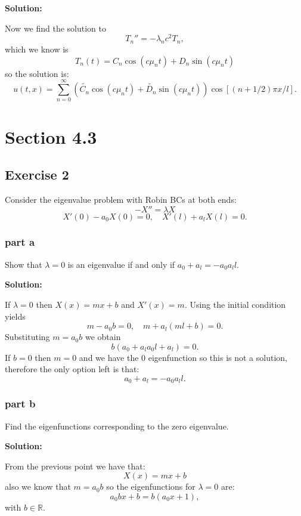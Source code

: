 \documentclass{article}
\begin{document}
\textbf{Solution:}

Now we find the solution to
\[
    T_n''=-\lambda_nc^2T_n,
\]
which we know is
\[
T_n(t)=C_n\cos(c\mu_n t) + D_n\sin(c\mu_n t)
\]
so the solution is:
\[
u(t,x)=\sum_{n=0}^\infty \left(\widetilde{C_n}\cos(c\mu_n t) +
    \widetilde{D_n}\sin(c\mu_n t)\right)\cos\left[\left(n+1/2\right)\pi
x/l\right].
\]
\section{Section 4.3}
\subsection{Exercise 2}
Consider the eigenvalue problem with Robin BCs at both ends:
\[
    -X''=\lambda X
\]
\[
    X'(0)-a_0X(0)=0, \quad X'(l)+a_lX(l)=0.
\]
\subsubsection{part a}
Show that $\lambda = 0$ is an eigenvalue if and only if $a_0+a_l=-a_0a_ll$.

\textbf{Solution:}

If $\lambda=0$ then $X(x)=mx+b$ and $X'(x)=m$. Using the initial condition
yields
\[
    m-a_0b=0, \quad m+a_l(ml+b)=0.
\]
Substituting $m=a_0b$ we obtain
\[
    b(a_0+a_la_0l+a_l)=0.
\]
If $b=0$ then $m=0$ and we have the 0 eigenfunction so this is not a solution,
therefore the only option left is that:
\[
    a_0+a_l=-a_0a_ll.
\]
\subsubsection{part b}
Find the eigenfunctions corresponding to the zero eigenvalue.

\textbf{Solution:}

From the previous point we have that:
\[
    X(x)=mx+b
\]
also we know that $m=a_0b$ so the eigenfunctions for $\lambda =0$ are:
\[
    a_0bx+b=b(a_0x+1),
\]
with $b\in \mathbb{R}$.
\end{document}
